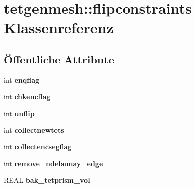 \hypertarget{classtetgenmesh_1_1flipconstraints}{\section{tetgenmesh\-:\-:flipconstraints Klassenreferenz}
\label{classtetgenmesh_1_1flipconstraints}
}
\subsection*{Öffentliche Attribute}
\begin{DoxyCompactItemize}
\item 
\hypertarget{classtetgenmesh_1_1flipconstraints_ad16c3c6607dd1bedc7b580245ed34f56}{int {\bfseries enqflag}}\label{classtetgenmesh_1_1flipconstraints_ad16c3c6607dd1bedc7b580245ed34f56}

\item 
\hypertarget{classtetgenmesh_1_1flipconstraints_a5cb16eed34f6726058a81ff226f138f7}{int {\bfseries chkencflag}}\label{classtetgenmesh_1_1flipconstraints_a5cb16eed34f6726058a81ff226f138f7}

\item 
\hypertarget{classtetgenmesh_1_1flipconstraints_aaa71c48602e685babeca9669f8921b10}{int {\bfseries unflip}}\label{classtetgenmesh_1_1flipconstraints_aaa71c48602e685babeca9669f8921b10}

\item 
\hypertarget{classtetgenmesh_1_1flipconstraints_abddbd27770a07502372a20c9d0dd346d}{int {\bfseries collectnewtets}}\label{classtetgenmesh_1_1flipconstraints_abddbd27770a07502372a20c9d0dd346d}

\item 
\hypertarget{classtetgenmesh_1_1flipconstraints_ae443417bfee2fe2d138ef19d1661668d}{int {\bfseries collectencsegflag}}\label{classtetgenmesh_1_1flipconstraints_ae443417bfee2fe2d138ef19d1661668d}

\item 
\hypertarget{classtetgenmesh_1_1flipconstraints_ab0ac97086329360ad119f215bd4fe02b}{int {\bfseries remove\-\_\-ndelaunay\-\_\-edge}}\label{classtetgenmesh_1_1flipconstraints_ab0ac97086329360ad119f215bd4fe02b}

\item 
\hypertarget{classtetgenmesh_1_1flipconstraints_abd1823bc4b973c204c9871630bc7e88b}{R\-E\-A\-L {\bfseries bak\-\_\-tetprism\-\_\-vol}}\label{classtetgenmesh_1_1flipconstraints_abd1823bc4b973c204c9871630bc7e88b}


\end{DoxyCompactItemize}
